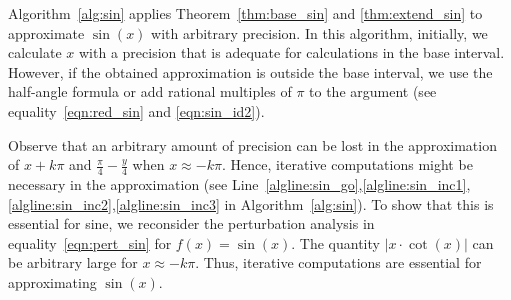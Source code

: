 \documentclass{article}
\newcommand{\true}{\textit{true}}
\newcommand{\om}{\overline{m}}
\newcommand{\on}{\overline{n}}
\numberwithin{mytheorem}{section}
\newcommand{\taylorsin}[3] {\sum_{i=#1}^{#2}\frac{(-1)^i}{(2i+1)!}{#3}^{2i+1}}
\newcommand{\taylorcos}[3] {\sum_{i=#1}^{#2}\frac{(-1)^i}{(2i)!}{#3}^{2i}}
\begin{document}
\begin{algorithm}
\ContinuedFloat
\caption{Sine (Continued)}
\end{algorithm}

Algorithm~\ref{alg:sin} applies Theorem~\ref{thm:base_sin} and \ref{thm:extend_sin} to approximate $\sin(x)$ with arbitrary precision. In this algorithm, initially, we calculate $x$ with a precision that is adequate for calculations in the base interval. However, if the obtained approximation is outside the base interval, we use the half-angle formula or add rational multiples of $\pi$ to the argument (see equality~\eqref{eqn:red_sin} and \eqref{eqn:sin_id2}). 

Observe that an arbitrary amount of precision can be lost in the approximation of $x+k\pi$ and $\frac{\pi}{4}-\frac{y}{4}$ when $x\approx -k\pi$. Hence, iterative computations might be necessary in the approximation (see Line~\ref{algline:sin_go},\ref{algline:sin_inc1},\ref{algline:sin_inc2},\ref{algline:sin_inc3} in Algorithm~\ref{alg:sin}). To show that this is essential for sine, we reconsider the perturbation analysis in equality~\eqref{eqn:pert_sin} for $f(x)=\sin(x)$. The quantity $|x\cdot\cot(x)|$ can be arbitrary large for $x\approx -k\pi$. Thus, iterative computations are essential for approximating $\sin(x)$.
\end{document}
